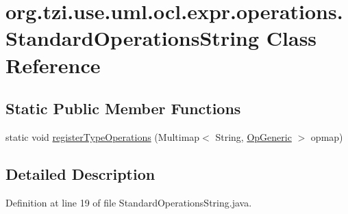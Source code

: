 \hypertarget{classorg_1_1tzi_1_1use_1_1uml_1_1ocl_1_1expr_1_1operations_1_1_standard_operations_string}{\section{org.\-tzi.\-use.\-uml.\-ocl.\-expr.\-operations.\-Standard\-Operations\-String Class Reference}
\label{classorg_1_1tzi_1_1use_1_1uml_1_1ocl_1_1expr_1_1operations_1_1_standard_operations_string}
}
\subsection*{Static Public Member Functions}
\begin{DoxyCompactItemize}
\item 
static void \hyperlink{classorg_1_1tzi_1_1use_1_1uml_1_1ocl_1_1expr_1_1operations_1_1_standard_operations_string_a1eefec882eb06752b4f4aacae3c181b3}{register\-Type\-Operations} (Multimap$<$ String, \hyperlink{classorg_1_1tzi_1_1use_1_1uml_1_1ocl_1_1expr_1_1operations_1_1_op_generic}{Op\-Generic} $>$ opmap)
\end{DoxyCompactItemize}


\subsection{Detailed Description}


Definition at line 19 of file Standard\-Operations\-String.\-java.



